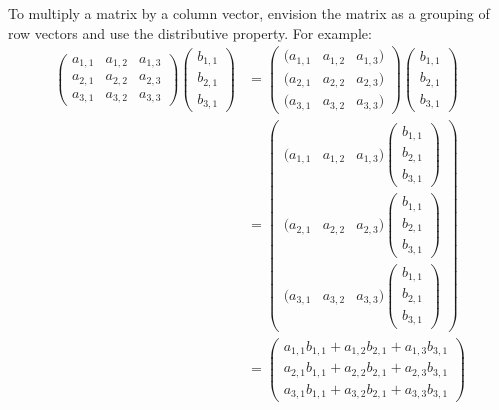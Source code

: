 \documentclass{ximera}
\begin{document}
To multiply a matrix by a column vector, envision the matrix as a
grouping of row vectors and use the distributive property. For
example:
\begin{align*}
\begin{pmatrix}
  a_{1,1} & a_{1,2} & a_{1,3} \\
  a_{2,1} & a_{2,2} & a_{2,3} \\
  a_{3,1} & a_{3,2} & a_{3,3}
\end{pmatrix}
\begin{pmatrix} b_{1,1} \\ b_{2,1} \\ b_{3,1} \end{pmatrix}
&=
\begin{pmatrix}
  (a_{1,1} & a_{1,2} & a_{1,3}) \\
  (a_{2,1} & a_{2,2} & a_{2,3}) \\
  (a_{3,1} & a_{3,2} & a_{3,3})
\end{pmatrix}
\begin{pmatrix} b_{1,1} \\ b_{2,1} \\ b_{3,1} \end{pmatrix}\\
&=
\begin{pmatrix}
  (a_{1,1} & a_{1,2} & a_{1,3}) \begin{pmatrix} b_{1,1} \\ b_{2,1} \\ b_{3,1} \end{pmatrix}\\
  (a_{2,1} & a_{2,2} & a_{2,3}) \begin{pmatrix} b_{1,1} \\ b_{2,1} \\ b_{3,1} \end{pmatrix}\\
  (a_{3,1} & a_{3,2} & a_{3,3}) \begin{pmatrix} b_{1,1} \\ b_{2,1} \\ b_{3,1} \end{pmatrix}
\end{pmatrix}\\
&=
\begin{pmatrix}
  a_{1,1}b_{1,1} + a_{1,2}b_{2,1} + a_{1,3}b_{3,1}  \\
  a_{2,1}b_{1,1} + a_{2,2}b_{2,1} + a_{2,3}b_{3,1}  \\
  a_{3,1}b_{1,1} + a_{3,2}b_{2,1} + a_{3,3}b_{3,1}
\end{pmatrix}
\end{align*}
\end{document}

